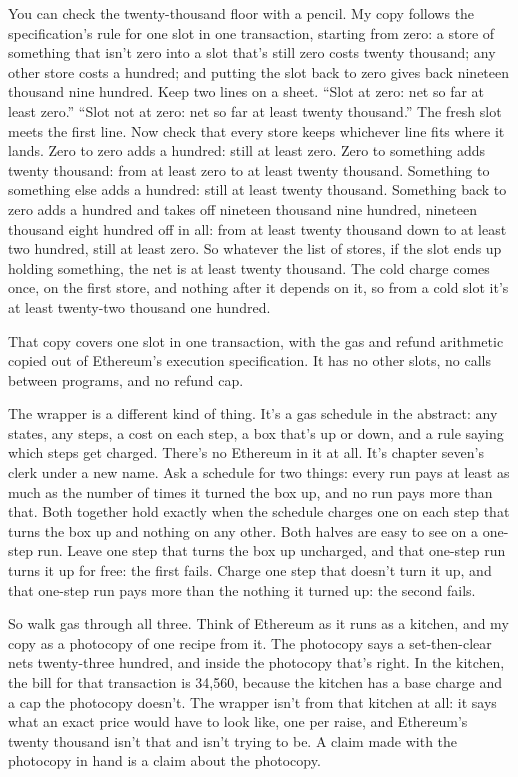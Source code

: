 \documentclass[11pt,twoside]{article}
\theoremstyle{thielethm}
\theoremstyle{thieledef}
\theoremstyle{thieledef}
\theoremstyle{thieledef}
\theoremstyle{thielethm}
\theoremstyle{thieleobs}
\theoremstyle{thielethm}
\begin{document}
You can check the twenty-thousand floor with a pencil. My copy follows the specification's rule for one slot in one transaction, starting from zero: a store of something that isn't zero into a slot that's still zero costs twenty thousand; any other store costs a hundred; and putting the slot back to zero gives back nineteen thousand nine hundred. Keep two lines on a sheet. ``Slot at zero: net so far at least zero.'' ``Slot not at zero: net so far at least twenty thousand.'' The fresh slot meets the first line. Now check that every store keeps whichever line fits where it lands. Zero to zero adds a hundred: still at least zero. Zero to something adds twenty thousand: from at least zero to at least twenty thousand. Something to something else adds a hundred: still at least twenty thousand. Something back to zero adds a hundred and takes off nineteen thousand nine hundred, nineteen thousand eight hundred off in all: from at least twenty thousand down to at least two hundred, still at least zero. So whatever the list of stores, if the slot ends up holding something, the net is at least twenty thousand. The cold charge comes once, on the first store, and nothing after it depends on it, so from a cold slot it's at least twenty-two thousand one hundred.

That copy covers one slot in one transaction, with the gas and refund arithmetic copied out of Ethereum's execution specification. It has no other slots, no calls between programs, and no refund cap.

The wrapper is a different kind of thing. It's a gas schedule in the abstract: any states, any steps, a cost on each step, a box that's up or down, and a rule saying which steps get charged. There's no Ethereum in it at all. It's chapter seven's clerk under a new name. Ask a schedule for two things: every run pays at least as much as the number of times it turned the box up, and no run pays more than that. Both together hold exactly when the schedule charges one on each step that turns the box up and nothing on any other. Both halves are easy to see on a one-step run. Leave one step that turns the box up uncharged, and that one-step run turns it up for free: the first fails. Charge one step that doesn't turn it up, and that one-step run pays more than the nothing it turned up: the second fails.

So walk gas through all three. Think of Ethereum as it runs as a kitchen, and my copy as a photocopy of one recipe from it. The photocopy says a set-then-clear nets twenty-three hundred, and inside the photocopy that's right. In the kitchen, the bill for that transaction is 34,560, because the kitchen has a base charge and a cap the photocopy doesn't. The wrapper isn't from that kitchen at all: it says what an exact price would have to look like, one per raise, and Ethereum's twenty thousand isn't that and isn't trying to be. A claim made with the photocopy in hand is a claim about the photocopy.
\end{document}
